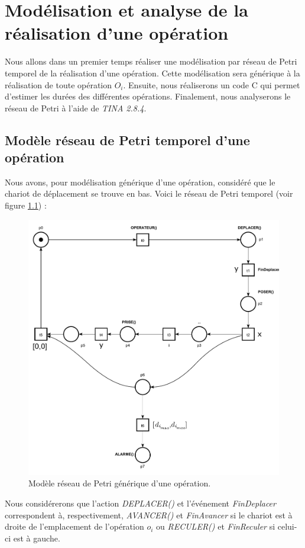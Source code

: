 \chapter{Modélisation et analyse de la réalisation d'une opération}\label{chap:realisationUneOperation}
Nous allons dans un premier temps réaliser une modélisation par réseau de Petri temporel de la réalisation d'une opération. Cette modélisation sera générique à la réalisation de toute opération $O_i$. Ensuite, nous réaliserons un code C qui permet d'estimer les durées des différentes opérations. Finalement, nous analyserons le réseau de Petri à l'aide de \emph{TINA 2.8.4}.

\section{Modèle réseau de Petri temporel d'une opération}\label{sec:modelGenerique}
Nous avons, pour modélisation générique d'une opération, considéré que le chariot de déplacement se trouve en bas. Voici le réseau de Petri temporel (voir figure \ref{fig:RdPTempo_generique}) : \\
\begin{figure}[!ht]
\centering
\includegraphics[width=.57\textwidth]{./I/images/III-1_v3.pdf}
\caption{\label{fig:RdPTempo_generique}Modèle réseau de Petri générique d'une opération.}
\end{figure}


Nous considérerons que l'action \emph{DEPLACER()} et l'événement \emph{FinDeplacer} correspondent à, respectivement, \emph{AVANCER()} et \emph{FinAvancer} si le chariot est à droite de l'emplacement de l'opération $o_i$  ou \emph{RECULER()} et \emph{FinReculer} si celui-ci est à gauche.



